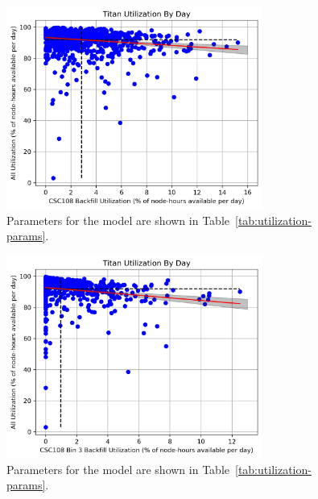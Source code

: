 \begin{figure}
  \includegraphics[width=0.75\textwidth]{images/linfit-utilization-by-true-day-all.png}
\caption{Parameters for the model are shown in
    Table~\ref{tab:utilization-params}.}
\label{fig:utilization-all}
\end{figure}


\begin{figure}
  \includegraphics[width=0.75\textwidth]{images/linfit-utilization-by-true-day-bin3.png}
\caption{Parameters for the model are shown in
    Table~\ref{tab:utilization-params}.}
\label{fig:utilization-bin3}
\end{figure}


